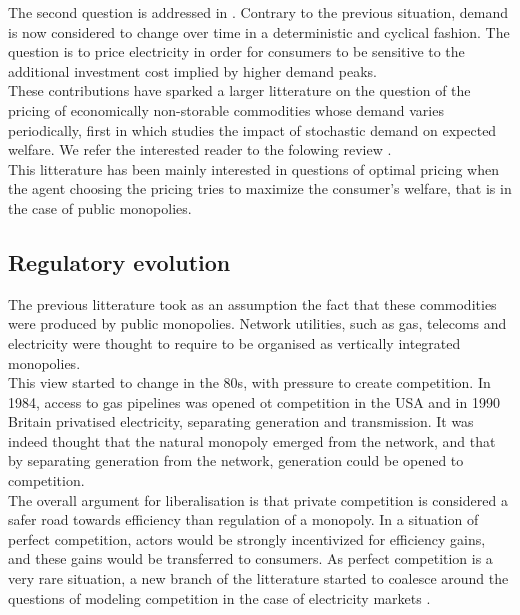 The second question is addressed in \cite{boiteux1960peak}. Contrary to the previous situation, demand is now considered to change over time in a deterministic and cyclical fashion. The question is to price electricity in order for consumers to be sensitive to the additional investment cost implied by higher demand peaks. \\

These contributions have sparked a larger litterature on the question of the pricing of economically non-storable commodities whose demand varies periodically, first in \cite{brown1969public} which studies the impact of stochastic demand on expected welfare. We refer the interested reader to the folowing review \cite{crew1995theory}. \\ 

This litterature has been mainly interested in questions of optimal pricing when the agent choosing the pricing tries to maximize the consumer's welfare, that is in the case of public monopolies. \\

\subsection*{Regulatory evolution}
The previous litterature took as an assumption the fact that these commodities were produced by public monopolies. Network utilities, such as gas, telecoms and electricity were thought to require to be organised as vertically integrated monopolies. \\

This view started to change in the 80s, with pressure to create competition. In 1984, access to gas pipelines was opened ot competition in the USA and in 1990 Britain privatised electricity, separating generation and transmission. It was indeed thought that the natural monopoly emerged from the network, and that by separating generation from the network, generation could be opened to competition. \\

The overall argument for liberalisation is that private competition is considered a safer road towards efficiency than regulation of a monopoly. In a situation of perfect competition, actors would be strongly incentivized for efficiency gains, and these gains would be transferred to consumers. As perfect competition is a very rare situation, a new branch of the litterature started to coalesce around the questions of modeling competition in the case of electricity markets \cite{newbery1997privatisation}. \\

